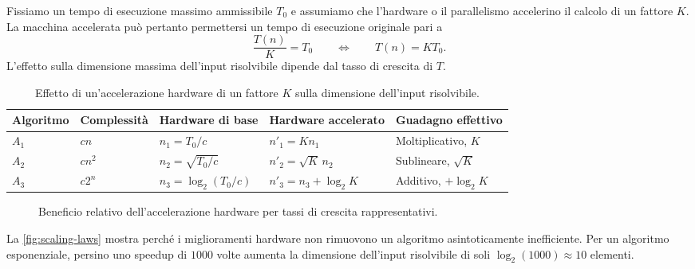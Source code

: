 Fissiamo un tempo di esecuzione massimo ammissibile $T_0$ e assumiamo che l'hardware o il parallelismo accelerino il calcolo di un fattore $K$. La macchina accelerata può pertanto permettersi un tempo di esecuzione originale pari a
\[
  \frac{T(n)}{K}=T_0
  \qquad\Longleftrightarrow\qquad
  T(n)=K T_0.
\]
L'effetto sulla dimensione massima dell'input risolvibile dipende dal tasso di crescita di $T$.

\begin{table}[H]
  \centering
  \small
  \caption{Effetto di un'accelerazione hardware di un fattore $K$ sulla dimensione dell'input risolvibile.}
  \label{tab:scaling-laws}
  \begin{tabularx}{\textwidth}{@{}p{}p{}YY>{\raggedright\arraybackslash}p{0.18\textwidth}@{}}
    \toprule
    Algoritmo & Complessità & Hardware di base & Hardware accelerato & Guadagno effettivo \\
    \midrule
    $A_1$ & $c n$ & $n_1=T_0/c$ & $n'_1=K n_1$ & Moltiplicativo, $K$ \\
    $A_2$ & $c n^2$ & $n_2=\sqrt{T_0/c}$ & $n'_2=\sqrt{K}\,n_2$ & Sublineare, $\sqrt K$ \\
    $A_3$ & $c2^n$ & $n_3=\log_2(T_0/c)$ & $n'_3=n_3+\log_2 K$ & Additivo, $+\log_2 K$ \\
    \bottomrule
  \end{tabularx}
\end{table}

\begin{figure}[H]
  \centering
  \caption{Beneficio relativo dell'accelerazione hardware per tassi di crescita rappresentativi.}
  \label{fig:scaling-laws}
\end{figure}

La \autoref{fig:scaling-laws} mostra perché i miglioramenti hardware non rimuovono un algoritmo asintoticamente inefficiente. Per un algoritmo esponenziale, persino uno speedup di $1000$ volte aumenta la dimensione dell'input risolvibile di soli $\log_2(1000)\approx 10$ elementi.

